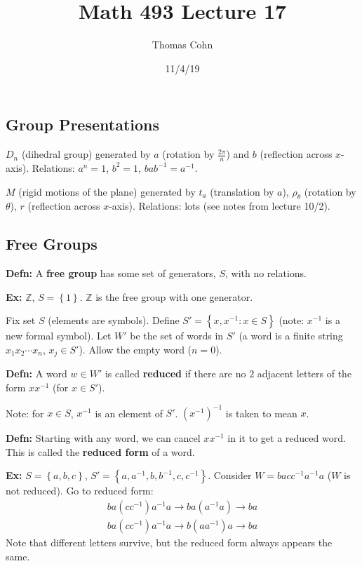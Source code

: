 \documentclass[10pt,letterpaper]{article}
\author{Thomas Cohn}
\title{Math 493 Lecture 17}
\date{11/4/19} %
\newcommand{\n}{\hfill\break}
\newcommand{\hangblock}[2]{\par\noindent\settowidth{\hangindent}{\textbf{#1: }}\textbf{#1: }\!\!\!#2}
\newcommand{\defn}[1]{\hangblock{Defn}{#1}}
\newcommand{\ex}[1]{\hangblock{Ex}{#1}}
\newcommand{\set}[1]{\left\{#1\right\}}
\newcommand{\integers}{\mathbb{Z}}
\newcommand{\Z}{\integers}
\newcommand{\inv}{^{-1}}
\begin{document}
\maketitle
\setlength\RaggedRightParindent{\parindent}
\RaggedRight

\subsection*{Group Presentations}

\par\noindent
$D_{n}$ (dihedral group) generated by $a$ (rotation by $\frac{2\pi}{n}$) and $b$ (reflection across $x$-axis).\n
Relations: $a^{n}=1$, $b^{2}=1$, $bab\inv=a\inv$.\n

\par\noindent
$M$ (rigid motions of the plane) generated by $t_{a}$ (translation by $a$), $\rho_{\theta}$ (rotation by $\theta$), $r$ (reflection across $x$-axis).\n
Relations: lots (see notes from lecture 10/2).\n

\subsection*{Free Groups}

\defn{
	A \textbf{free group} has some set of generators, $S$, with no relations.\n
}

\ex{
	$\Z$, $S=\set{1}$. $\Z$ is the free group with one generator.\n
}

\par\noindent
Fix set $S$ (elements are symbols). Define $S'=\set{x,x\inv:x\in{}S}$ (note: $x\inv$ is a new formal symbol). Let $W'$ be the set of words in $S'$ (a word is a finite string $x_{1}x_{2}\cdots{}x_{n}$, $x_{j}\in{}S'$). Allow the empty word ($n=0$).\n

\defn{
	A word $w\in{}W'$ is called \textbf{reduced} if there are no $2$ adjacent letters of the form $xx\inv$ (for $x\in{}S'$).\n
}

\par\noindent
Note: for $x\in{}S$, $x\inv$ is an element of $S'$. $(x\inv)\inv$ is taken to mean $x$.\n

\defn{
	Starting with any word, we can cancel $xx\inv$ in it to get a reduced word. This is called the \textbf{reduced form} of a word.\n
}

\ex{
	$S=\set{a,b,c}$, $S'=\set{a,a\inv,b,b\inv,c,c\inv}$. Consider $W=bacc\inv{}a\inv{}a$ ($W$ is not reduced). Go to reduced form:
	\[
		\begin{array}{l}
			ba(cc\inv{})a\inv{}a\to{}ba(a\inv{}a)\to{}ba\\
			ba(cc\inv{})a\inv{}a\to{}b(aa\inv{})a\to{}ba
		\end{array}
	\]
	Note that different letters survive, but the reduced form always appears the same.\n
}
\end{document}
